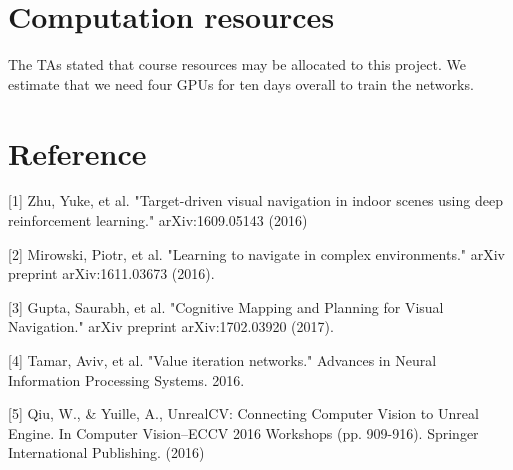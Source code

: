 \documentclass{article}
\begin{document}
\section*{Computation resources}
The TAs stated that course resources may be allocated to this project. We estimate that we need four GPUs for ten days overall to train the networks.

\section*{Reference}
[1] Zhu, Yuke, et al. "Target-driven visual navigation in indoor scenes using deep reinforcement learning." arXiv:1609.05143 (2016)

[2] Mirowski, Piotr, et al. "Learning to navigate in complex environments." arXiv preprint arXiv:1611.03673 (2016).

[3] Gupta, Saurabh, et al. "Cognitive Mapping and Planning for Visual Navigation." arXiv preprint arXiv:1702.03920 (2017).

[4] Tamar, Aviv, et al. "Value iteration networks." Advances in Neural Information Processing Systems. 2016.

[5] Qiu, W., \& Yuille, A., UnrealCV: Connecting Computer Vision to Unreal Engine. In Computer Vision–ECCV 2016 Workshops (pp. 909-916). Springer International Publishing. (2016)
\end{document}

